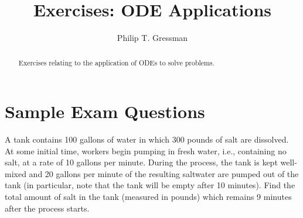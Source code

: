 \documentclass{ximera}
\title{Exercises: ODE Applications}
\author{Philip T. Gressman}
\begin{document}
\begin{abstract}
Exercises relating to the application of ODEs to solve problems.
\end{abstract}
\maketitle

\section*{Sample Exam Questions}

\begin{question}%

A tank contains 100 gallons of water in which 300 pounds of salt are dissolved. At some initial time, workers begin pumping in fresh water, i.e., containing no salt, at a rate of 10 gallons per minute. During the process, the tank is kept well-mixed and 20 gallons per minute of the resulting saltwater are pumped out of the tank (in particular, note that the tank will be empty after 10 minutes). Find the total amount of salt in the tank (measured in pounds) which remains 9 minutes after the process starts.
\begin{multiplechoice}
\end{multiplechoice}

\end{question}
\end{document}
